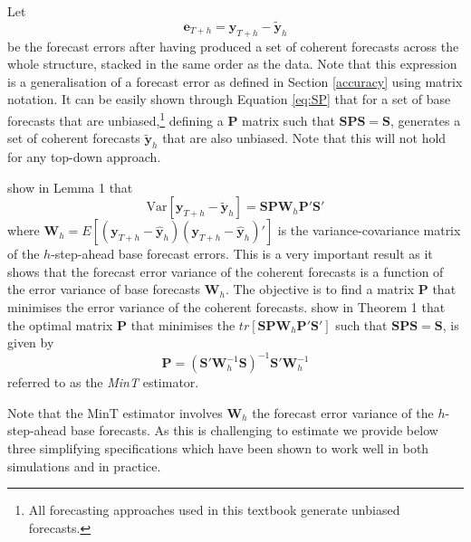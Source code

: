 \documentclass[]{book}
\let\rmarkdownfootnote\footnote%
\def\footnote{\protect\rmarkdownfootnote}
\begin{document}
Let \[\bm{e}_{T+h}=\bm{y}_{T+h}-\tilde{\bm{y}}_h\] be the forecast errors after having produced a set of coherent forecasts across the whole structure, stacked in the same order as the data. Note that this expression is a generalisation of a forecast error as defined in Section \ref{accuracy} using matrix notation. It can be easily shown through Equation \eqref{eq:SP} that for a set of base forecasts that are unbiased,\footnote{All forecasting approaches used in this textbook generate unbiased forecasts.} defining a \(\bm{P}\) matrix such that \(\bm{S}\bm{P}\bm{S}=\bm{S}\), generates a set of coherent forecasts \(\bm{\tilde{y}}_h\) that are also unbiased. Note that this will not hold for any top-down approach.

\citet{Mint} show in Lemma 1 that
\begin{equation*}
\text{Var}[\bm{y}_{T+h}-\tilde{\bm{y}}_h]=\bm{S}\bm{P}\bm{W}_h\bm{P}'\bm{S}'
\end{equation*}
where \(\bm{W}_h=E[(\bm{y}_{T+h}-\hat{\bm{y}}_h)(\bm{y}_{T+h}-\hat{\bm{y}}_h)']\) is the variance-covariance matrix of the \(h\)-step-ahead base forecast errors. This is a very important result as it shows that the forecast error variance of the coherent forecasts is a function of the error variance of base forecasts \(\bm{W}_h\). The objective is to find a matrix \(\bm{P}\) that minimises the error variance of the coherent forecasts. \citet{Mint} show in Theorem 1 that the optimal matrix \(\bm{P}\) that minimises the \(tr[\bm{S}\bm{P}\bm{W}_h\bm{P}'\bm{S}']\) such that \(\bm{S}\bm{P}\bm{S}=\bm{S}\), is given by
\begin{equation}
\bm{P}=(\bm{S}'\bm{W}_h^{-1}\bm{S})^{-1}\bm{S}'\bm{W}_h^{-1}
\label{eq:MinT}
\end{equation}
referred to as the \emph{MinT} estimator.

Note that the MinT estimator involves \(\bm{W}_h\) the forecast error variance of the \(h\)-step-ahead base forecasts. As this is challenging to estimate we provide below three simplifying specifications which have been shown to work well in both simulations and in practice.
\end{document}
